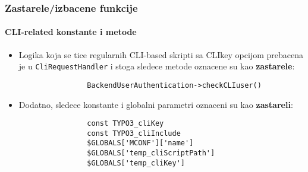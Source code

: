 
\begin{frame}[fragile]
	\frametitle{Zastarele/izbacene funkcije}
	\framesubtitle{CLI-related konstante i metode}


	\begin{itemize}

		\item Logika koja se tice regularnih CLI-based skripti sa CLIkey opcijom 
			prebacena je u \texttt{CliRequestHandler} i stoga sledece metode oznacene su kao \textbf{zastarele}:

			\begin{lstlisting}
				BackendUserAuthentication->checkCLIuser()
			\end{lstlisting}

		\item Dodatno, sledece konstante i globalni parametri oznaceni su kao
			 \textbf{zastareli}:

			\begin{lstlisting}
				const TYPO3_cliKey
				const TYPO3_cliInclude
				$GLOBALS['MCONF']['name']
				$GLOBALS['temp_cliScriptPath']
				$GLOBALS['temp_cliKey']
			\end{lstlisting}

	\end{itemize}

\end{frame}


